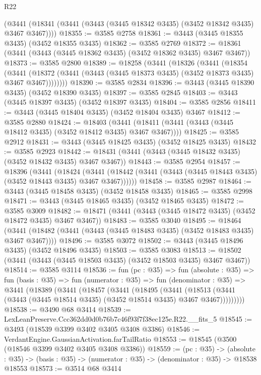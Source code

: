 \begin{lexlean}{R22}
\begin{coremodule}
    (@3441 (@18341 (@3441 (@3443 (@3445 @18342 @3435) (@3452 @18342 @3435) @3467 @3467))))
@18355 := @3585 @2758
@18361 := @3443 (@3445 @18355 @3435) (@3452 @18355 @3435)
@18362 := @3585 @2769
@18372 := @18361 (@3441 (@3443 (@3445 @18362 @3435) (@3452 @18362 @3435) @3467 @3467))
@18373 := @3585 @2800
@18389 := @18258
    (@3441
      (@18326
        (@3441
          (@18354
            (@3441
              (@18372 (@3441 (@3443 (@3445 @18373 @3435) (@3452 @18373 @3435) @3467 @3467))))))))
@18390 := @3585 @2834
@18396 := @3443 (@3445 @18390 @3435) (@3452 @18390 @3435)
@18397 := @3585 @2845
@18403 := @3443 (@3445 @18397 @3435) (@3452 @18397 @3435)
@18404 := @3585 @2856
@18411 := @3443 (@3445 @18404 @3435) (@3452 @18404 @3435) @3467
@18412 := @3585 @2880
@18424 := @18403
    (@3441 (@18411 (@3441 (@3443 (@3445 @18412 @3435) (@3452 @18412 @3435) @3467 @3467))))
@18425 := @3585 @2912
@18431 := @3443 (@3445 @18425 @3435) (@3452 @18425 @3435)
@18432 := @3585 @2923
@18442 := @18431 (@3441 (@3443 (@3445 @18432 @3435) (@3452 @18432 @3435) @3467 @3467))
@18443 := @3585 @2954
@18457 := @18396
    (@3441
      (@18424
        (@3441 (@18442 (@3441 (@3443 (@3445 @18443 @3435) (@3452 @18443 @3435) @3467 @3467))))))
@18458 := @3585 @2987
@18464 := @3443 (@3445 @18458 @3435) (@3452 @18458 @3435)
@18465 := @3585 @2998
@18471 := @3443 (@3445 @18465 @3435) (@3452 @18465 @3435)
@18472 := @3585 @3009
@18482 := @18471 (@3441 (@3443 (@3445 @18472 @3435) (@3452 @18472 @3435) @3467 @3467))
@18483 := @3585 @3040
@18495 := @18464
    (@3441 (@18482 (@3441 (@3443 (@3445 @18483 @3435) (@3452 @18483 @3435) @3467 @3467))))
@18496 := @3585 @3072
@18502 := @3443 (@3445 @18496 @3435) (@3452 @18496 @3435)
@18503 := @3585 @3083
@18513 := @18502 (@3441 (@3443 (@3445 @18503 @3435) (@3452 @18503 @3435) @3467 @3467))
@18514 := @3585 @3114
@18536 := fun (pc : @35) =>
  fun (absolute : @35) =>
  fun (basis : @35) =>
  fun (numerator : @35) =>
  fun (denominator : @35) =>
  @3441
    (@18389
      (@3441
        (@18457
          (@3441
            (@18495
              (@3441
                (@18513 (@3441 (@3443 (@3445 @18514 @3435) (@3452 @18514 @3435) @3467 @3467)))))))))
@18538 := @3490 @68 @3414
@18539 := LexLeanPreserve.Ccc362dd0d0b76b7c46f93f7f38ec125e.R22.__fits_5
@18545 := @3493 (@18539 @3399 @3402 @3405 @3408 @3386)
@18546 := VerdantEngine.GaussianActivation.farTailRatio
@18553 := @18545 (@3500 (@18546 @3399 @3402 @3405 @3408 @3386))
@18559 := (pc : @35) ->
  (absolute : @35) -> (basis : @35) -> (numerator : @35) -> (denominator : @35) -> @18538 @18553
@18573 := @3514
    @68
    @3414

\end{coremodule}
\end{lexlean}
